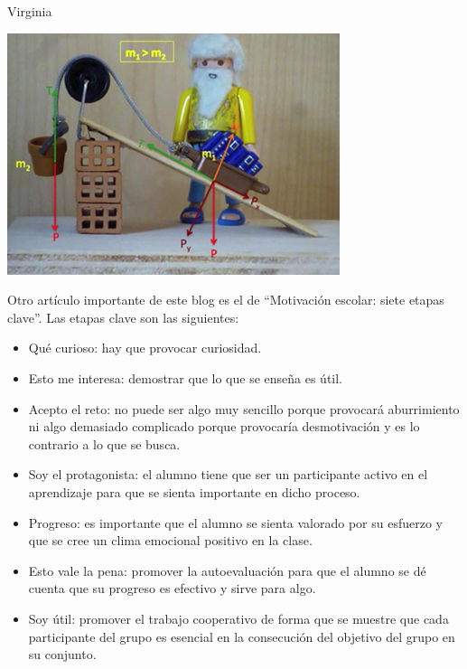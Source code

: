 \begin{opin}{\virgicolor}{Virginia}
\begin{minipage}[hbtp]{1.0\linewidth}
\centering
\includegraphics[scale=0.67]{img/playmovil.png}
\label{playmovil}
\end{minipage}


Otro artículo importante de este blog es el de “Motivación escolar: siete etapas clave”. Las etapas clave son las siguientes:

\begin{itemize}

\item Qué curioso: hay que provocar curiosidad. 

\item Esto me interesa: demostrar que lo que se enseña es útil. 

\item Acepto el reto: no puede ser algo muy sencillo porque provocará aburrimiento ni algo demasiado complicado porque provocaría desmotivación y es lo contrario a lo que se busca. 

\item Soy el protagonista: el alumno tiene que ser un participante activo en el aprendizaje para que se sienta importante en dicho proceso. 

\item Progreso: es importante que el alumno se sienta valorado por su esfuerzo y que se cree un clima emocional positivo en la clase. 

\item Esto vale la pena: promover la autoevaluación para que el alumno se dé cuenta que su progreso es efectivo y sirve para algo. 

\item Soy útil: promover el trabajo cooperativo de forma que se muestre que cada participante del grupo es esencial en la consecución del objetivo del grupo en su conjunto. 
\end{itemize}

\end{opin}
